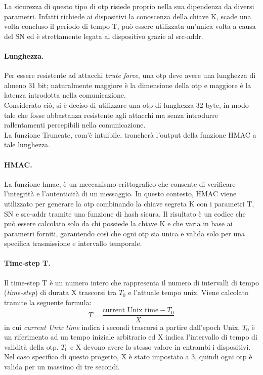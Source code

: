 La sicurezza di questo tipo di \gls{otp} risiede proprio nella sua dipendenza da diversi parametri. Infatti richiede ai dispositivi la conoscenza della chiave K, scade una volta concluso il periodo di tempo T, può essere utilizzata un'unica volta a causa del SN ed è strettamente legata al dispositivo grazie al src-addr.

\paragraph{Lunghezza.}
Per essere resistente ad attacchi \textit{brute force}, una \gls{otp} deve avere una lunghezza di almeno 31 bit; naturalmente maggiore è la dimensione della \gls{otp} e maggiore è la latenza introdotta nella comunicazione.\\
Considerato ciò, si è deciso di utilizzare una \gls{otp} di lunghezza 32 byte, in modo tale che fosse abbastanza resistente agli attacchi ma senza introdurre rallentamenti percepibili nella comunicazione.\\
La funzione Truncate, com'è intuibile, troncherà l'output della funzione HMAC a tale lunghezza.

\paragraph{HMAC.}
La funzione \gls{hmac}, è un meccanismo crittografico che consente di verificare l'integrità e l'autenticità di un messaggio. In questo contesto, HMAC viene utilizzato per generare la \gls{otp} combinando la chiave segreta K con i parametri T, SN e src-addr tramite una funzione di hash sicura. Il risultato è un codice che può essere calcolato solo da chi possiede la chiave K e che varia in base ai parametri forniti, garantendo così che ogni \gls{otp} sia unica e valida solo per una specifica trasmissione e intervallo temporale.

\paragraph{Time-step T.}
Il time-step T è un numero intero che rappresenta il numero di intervalli di tempo (\textit{time-step}) di durata X trascorsi tra $T_0$ e l'attuale tempo unix. Viene calcolato tramite la seguente formula:
\begin{equation}
    T = \frac{\text{current Unix time} - T_0}{X}
    \label{eq:timestep}
\end{equation}
in cui \textit{current Unix time} indica i secondi trascorsi a partire dall'epoch Unix, $T_0$ è un riferimento ad un tempo iniziale arbitrario ed X indica l'intervallo di tempo di validità della \gls{otp}. $T_0$ e X devono avere lo stesso valore in entrambi i dispositivi.
Nel caso specifico di questo progetto, X è stato impostato a 3, quindi ogni \gls{otp} è valida per un massimo di tre secondi.

